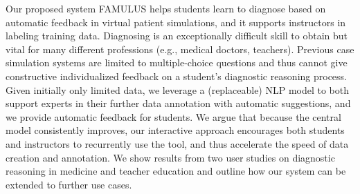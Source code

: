 Our proposed system FAMULUS helps students learn to diagnose based on automatic feedback in virtual patient simulations, and it supports instructors in labeling training data. Diagnosing is an exceptionally  difficult skill to obtain but vital for many different professions (e.g., medical doctors, teachers). Previous case simulation systems are limited to multiple-choice questions and thus cannot give constructive individualized feedback on a student's diagnostic reasoning process. Given initially only limited data, we leverage a (replaceable) NLP model to both support experts in their further data annotation with automatic suggestions, and we provide automatic feedback for students. We argue that because the central model consistently improves, our interactive approach encourages both students and instructors to recurrently use the tool, and thus accelerate the speed of data creation and annotation. We show results from two user studies on diagnostic reasoning in medicine and teacher education and outline how our system can be extended to further use cases.